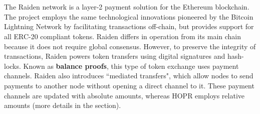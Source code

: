 \\~\\The Raiden network \cite{raiden} is a layer-2 payment solution for the Ethereum blockchain. The project employs the same technological innovations pioneered by the Bitcoin Lightning Network by facilitating transactions off-chain, but provides support for all ERC-20 compliant tokens. Raiden differs in operation from its main chain because it does not require global consensus. However, to preserve the integrity of transactions, Raiden powers token transfers using digital signatures and hash-locks. Known as \textbf{balance proofs}, this type of token exchange uses payment channels. Raiden also introduces ``mediated transfers", which allow nodes to send payments to another node without opening a direct channel to it. These payment channels are updated with absolute amounts, whereas HOPR employs relative amounts (more details in the  section).

